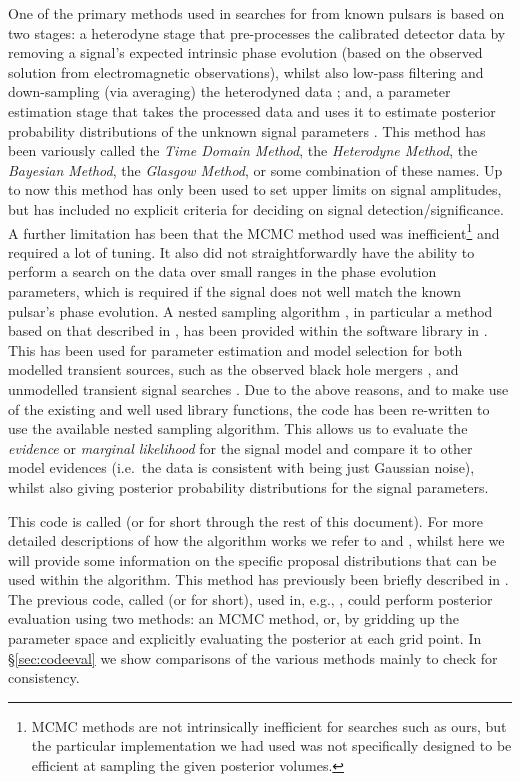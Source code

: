 One of the primary methods used in searches for \gws from known pulsars is based on two stages: a heterodyne
stage that pre-processes the calibrated \gw detector data by removing a signal's expected intrinsic phase
evolution (based on the observed solution from electromagnetic observations), whilst also low-pass filtering and
down-sampling (via averaging) the heterodyned data \citep{2005PhRvD..72j2002D}; and, a parameter estimation stage that takes the
processed data and uses it to estimate posterior probability distributions of the unknown signal parameters
\citep[e.g., using a Markov chain Monte Carlo (MCMC)][]{2010ApJ...713..671A}. This method has been variously
called the {\it Time Domain Method}, the {\it Heterodyne Method}, the {\it Bayesian Method}, the {\it Glasgow
Method}, or some combination of these names. Up to now this method has only been used to set upper limits
on signal amplitudes, but has included no explicit criteria for deciding on signal detection/significance. A further
limitation has been that the MCMC method used was inefficient\footnote{MCMC methods are not intrinsically inefficient for
searches such as ours, but the particular implementation we had used was not specifically designed to be efficient at sampling the
given posterior volumes.} and required a lot of tuning. It also
did not straightforwardly have the ability to perform a search on the data over small ranges in the phase
evolution parameters, which is required if the \gw signal does not well match the known pulsar's phase evolution. A nested sampling
algorithm \citep{Skilling:2006}, in particular a method based on that described in \citet{Veitch:2010}, has been provided within
the \lalinf software library \citep{2015PhRvD..91d2003V} in \citet{lalsuite}. This has been used for parameter estimation and model
selection for both modelled transient sources, such as the observed black hole mergers \citep{2016PhRvL.116x1102A}, and unmodelled transient signal
searches \citep{2015arXiv151105955L}. Due to the above reasons, and to make use of the existing and well used library functions, the code has been
re-written to use the available nested sampling algorithm. This allows us to evaluate the {\it evidence} or {\it
marginal likelihood} for the signal model and compare it to other model evidences (i.e.\ the data is consistent with being just
Gaussian noise), whilst also giving posterior probability distributions for the signal parameters.

This code is called \lppenf (or \lppen for short through the rest of this document). For more detailed descriptions of how the algorithm works we refer
to \citet{Veitch:2010} and \citep{2015PhRvD..91d2003V}, whilst here we will provide some information on the specific proposal
distributions that can be used within the algorithm. This method has previously been briefly described in \citet{2012JPhCS.363a2041P}.
The previous code, called \lppef (or \lppe for short), used in, e.g., \citet{2010ApJ...713..671A}, could perform posterior evaluation
using two methods: an MCMC method, or, by gridding up the parameter space and explicitly evaluating the posterior at each
grid point. In \S\ref{sec:codeeval} we show comparisons of the various methods mainly to check \lppen for consistency.

